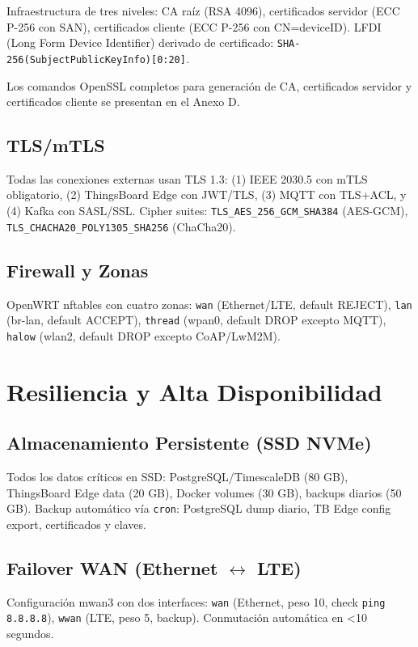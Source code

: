 Infraestructura de tres niveles: CA raíz (RSA 4096), certificados servidor (ECC P-256 con SAN), certificados cliente (ECC P-256 con CN=deviceID). LFDI (Long Form Device Identifier) derivado de certificado: \texttt{SHA-256(SubjectPublicKeyInfo)[0:20]}.

Los comandos OpenSSL completos para generación de CA, certificados servidor y certificados cliente se presentan en el Anexo D.

\subsection{TLS/mTLS}

Todas las conexiones externas usan TLS 1.3: (1) IEEE 2030.5 con mTLS obligatorio, (2) ThingsBoard Edge con JWT/TLS, (3) MQTT con TLS+ACL, y (4) Kafka con SASL/SSL. Cipher suites: \texttt{TLS\_AES\_256\_GCM\_SHA384} (AES-GCM), \texttt{TLS\_CHACHA20\_POLY1305\_SHA256} (ChaCha20).

\subsection{Firewall y Zonas}

OpenWRT nftables con cuatro zonas: \texttt{wan} (Ethernet/LTE, default REJECT), \texttt{lan} (br-lan, default ACCEPT), \texttt{thread} (wpan0, default DROP excepto MQTT), \texttt{halow} (wlan2, default DROP excepto CoAP/LwM2M).

\section{Resiliencia y Alta Disponibilidad}

\subsection{Almacenamiento Persistente (SSD NVMe)}

Todos los datos críticos en SSD: PostgreSQL/TimescaleDB (80 GB), ThingsBoard Edge data (20 GB), Docker volumes (30 GB), backups diarios (50 GB). Backup automático vía \texttt{cron}: PostgreSQL dump diario, TB Edge config export, certificados y claves.

\subsection{Failover WAN (Ethernet $\leftrightarrow$ LTE)}

Configuración mwan3 con dos interfaces: \texttt{wan} (Ethernet, peso 10, check \texttt{ping 8.8.8.8}), \texttt{wwan} (LTE, peso 5, backup). Conmutación automática en <10 segundos.

